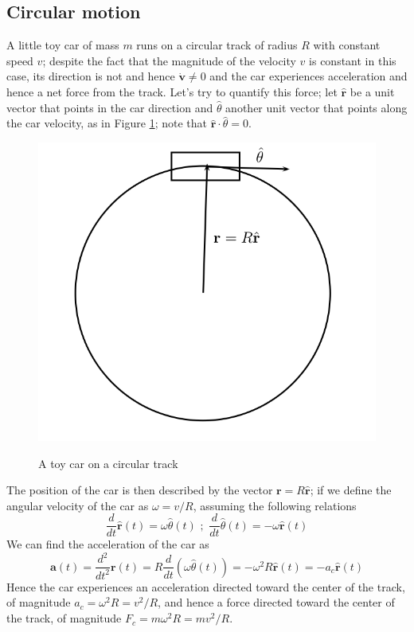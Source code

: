 \documentclass[11pt, a4paper,oneside,openright]{book}
\numberwithin{equation}{section}
\begin{document}
\subsection{Circular motion}
A little toy car of mass $m$ runs on a circular track of radius $R$ with constant speed $v$; despite the fact that the magnitude of the velocity $v$ is constant in this case, its direction is not and hence $\dot{\mathbf{v}}\neq 0$ and the car experiences acceleration and hence a net force from the track. Let's try to quantify this force; let $\hat{\mathbf{r}}$ be a unit vector that points in the car direction and $\hat{\theta}$ another unit vector that points along the car velocity, as in Figure \ref{track}; note that $\hat{\mathbf{r}}\cdot \hat{\theta}=0$. 
\begin{figure}
\begin{center}
\includegraphics[scale=0.7]{Draw/circular.png}
\label{}
\end{center}
\caption{A toy car on a circular track}
\label{track}
\end{figure}
The position of the car is then described by the vector $\mathbf{r}=R\hat{\mathbf{r}}$; if we define the angular velocity of the car as $\omega=v/R$, assuming the following relations 
\begin{equation}
\frac{d}{dt}\hat{\mathbf{r}}(t)=\omega \hat{\theta}(t) \,\, ; \,\, \frac{d}{dt}\hat{\theta}(t)=-\omega \hat{\mathbf{r}}(t)
\end{equation}
We can find the acceleration of the car as
\begin{equation}
\label{centripetal}
\mathbf{a}(t)=\frac{d^2}{dt^2}\mathbf{r}(t)=R\frac{d}{dt}(\omega \hat{\theta}(t))=-\omega^2R\hat{\mathbf{r}}(t)=-a_c\hat{\mathbf{r}}(t) 
\end{equation}
Hence the car experiences an acceleration directed toward the center of the track, of magnitude $a_c=\omega^2R=v^2/R$, and hence a force directed toward the center of the track, of magnitude $F_c=m\omega^2 R=mv^2/R$.
\end{document}

